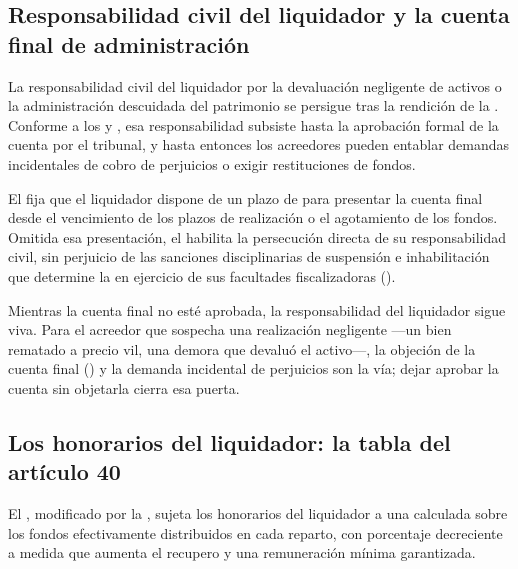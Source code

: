 \subsection{Responsabilidad civil del liquidador y la cuenta final de administración}

La responsabilidad civil del liquidador por la devaluación negligente de activos o la
administración descuidada del patrimonio se persigue tras la rendición de la . Conforme a los  y , esa responsabilidad subsiste
hasta la aprobación formal de la cuenta por el tribunal, y hasta entonces los acreedores pueden
entablar demandas incidentales de cobro de perjuicios o exigir restituciones de fondos.

El  fija que el liquidador dispone de un plazo de  para
presentar la cuenta final desde el vencimiento de los plazos de realización o el agotamiento de
los fondos. Omitida esa presentación, el  habilita la persecución directa de su
responsabilidad civil, sin perjuicio de las sanciones disciplinarias de suspensión e
inhabilitación que determine la \superir{} en ejercicio de sus facultades fiscalizadoras
().

\begin{foco}
Mientras la cuenta final no esté aprobada, la responsabilidad del liquidador sigue viva. Para
el acreedor que sospecha una realización negligente ---un bien rematado a precio vil, una
demora que devaluó el activo---, la objeción de la cuenta final () y la demanda
incidental de perjuicios son la vía; dejar aprobar la cuenta sin objetarla cierra esa puerta.
\end{foco}

\subsection{Los honorarios del liquidador: la tabla del artículo 40}

El , modificado por la \Lreforma{}, sujeta los honorarios del liquidador a una
 calculada sobre los fondos efectivamente distribuidos en
cada reparto, con porcentaje decreciente a medida que aumenta el recupero y una remuneración
mínima garantizada.

